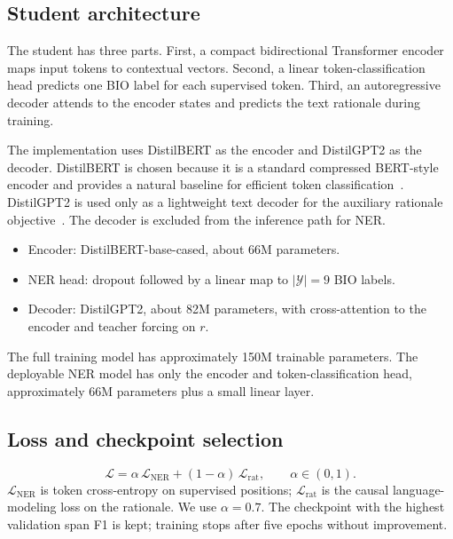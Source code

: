 \documentclass[a4paper,12pt]{extarticle}
\begin{document}
\subsection{Student architecture}
The student has three parts. First, a compact bidirectional Transformer encoder maps input tokens to contextual vectors. Second, a linear token-classification head predicts one BIO label for each supervised token. Third, an autoregressive decoder attends to the encoder states and predicts the text rationale during training.

The implementation uses DistilBERT as the encoder and DistilGPT2 as the decoder. DistilBERT is chosen because it is a standard compressed BERT-style encoder and provides a natural baseline for efficient token classification~\cite{sanh2019distilbert}. DistilGPT2 is used only as a lightweight text decoder for the auxiliary rationale objective~\cite{radford2019language}. The decoder is excluded from the inference path for NER.

\begin{itemize}
    \item Encoder: DistilBERT-base-cased, about 66M parameters.
    \item NER head: dropout followed by a linear map to $|\mathcal{Y}|{=}9$ BIO labels.
    \item Decoder: DistilGPT2, about 82M parameters, with cross-attention to the encoder and teacher forcing on $r$.
\end{itemize}

The full training model has approximately 150M trainable parameters. The deployable NER model has only the encoder and token-classification head, approximately 66M parameters plus a small linear layer.

\subsection{Loss and checkpoint selection}
\begin{equation}
\label{eq:total-loss}
\mathcal{L} = \alpha\,\mathcal{L}_{\mathrm{NER}} + (1-\alpha)\,\mathcal{L}_{\mathrm{rat}}, \qquad \alpha \in (0,1).
\end{equation}
$\mathcal{L}_{\mathrm{NER}}$ is token cross-entropy on supervised positions; $\mathcal{L}_{\mathrm{rat}}$ is the causal language-modeling loss on the rationale. We use $\alpha{=}0.7$. The checkpoint with the highest validation span F1 is kept; training stops after five epochs without improvement.
\end{document}
